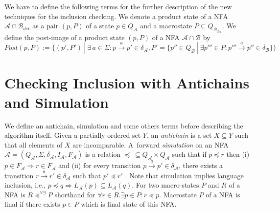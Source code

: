 We have to define the following terms for the further description of the new techniques for the inclusion checking.
We denote a product state of a NFA $\mathcal{A} \cap \mathcal{B}_{det}$ as a pair $(p,P)$ of a state $p\in Q_\mathcal{A}$ and a 
macrostate $P \subseteq Q_{\mathcal{B}_{det}}$.
We define the post-image of a product state $(p,P)$ of a NFA $\mathcal{A}\cap \mathcal{B}$ by
$Post(p,P):=\{(p',P')\ |\ \exists\, a \in \Sigma: p\xrightarrow{a} p' \in \delta_\mathcal{A}, P'=
\{p''\in Q_\mathcal{B}\ |\ \exists p''' \in P:p'''\xrightarrow{a} p''\in \delta_\mathcal{B}\}\}$

\section{Checking Inclusion with Antichains and Simulation}
\label{sectionAntichain}
We define an antichain, simulation and some others terms before describing the algorithm itself.
Given a partially ordered set $Y$, an \emph {antichain} is a set $X \subseteq Y$ such that all elements of $X$ are incomparable.
A~forward \emph{simulation} on an NFA $\mathcal{A}=(Q_\mathcal{A},\Sigma,\delta_\mathcal{A},I_\mathcal{A},F_\mathcal{A})$ 
is a relation $\preceq\  \subseteq Q_\mathcal{A} \times Q_\mathcal{A}$ 
such that if $p \preceq r$ then (i) $p \in F_\mathcal{A} 
\Rightarrow r \in F_\mathcal{A}$ and (ii) for every transition $p\xrightarrow{a}p' \in \delta_\mathcal{A}$, there exists a transition 
$r\xrightarrow{a}r' \in \delta_\mathcal{A}$ such that $p' \preceq r'$  \cite{focs95}. 
Note that simulation implies language inclusion, i.e., $p\preceq q \Rightarrow L_\mathcal{A}(p)
\subseteq L_\mathcal{A}(q)$. 
%
For two macro-states $P$ and $R$ of a NFA is $R\preceq^{\forall\exists}P$ shorthand for $\forall r\in R.\exists p \in P: r \preceq p$.
Macrostate $P$ of a NFA is final if there exists $p\in P$ which is final state of this NFA.

